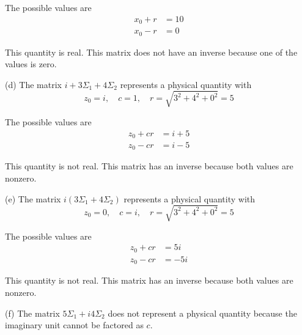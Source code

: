 The possible values are
\begin{equation*}
\begin{aligned}
x_0+r&=10
\\
x_0-r&=0
\end{aligned}
\end{equation*}

This quantity is real.
This matrix does not have an inverse because one of the values is zero.

\bigskip
(d) The matrix $i+3\Sigma_1+4\Sigma_2$ represents a physical quantity with
\begin{equation*}
z_0=i,\quad c=1,\quad r=\sqrt{3^2+4^2+0^2}=5
\end{equation*}

The possible values are
\begin{equation*}
\begin{aligned}
z_0+cr&=i+5
\\
z_0-cr&=i-5
\end{aligned}
\end{equation*}

This quantity is not real.
This matrix has an inverse because both values are nonzero.

\bigskip
(e) The matrix $i(3\Sigma_1+4\Sigma_2)$ represents a physical quantity with
\begin{equation*}
z_0=0,\quad c=i,\quad r=\sqrt{3^2+4^2+0^2}=5
\end{equation*}

The possible values are
\begin{equation*}
\begin{aligned}
z_0+cr&=5i
\\
z_0-cr&=-5i
\end{aligned}
\end{equation*}

This quantity is not real.
This matrix has an inverse because both values are nonzero.

\bigskip
(f) The matrix $5\Sigma_1+i4\Sigma_2$ does not represent a physical quantity
because the imaginary unit cannot be factored as $c$.


